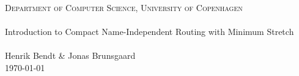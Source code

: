 \begin{titlingpage}
\begin{center}

\normalfont \normalsize
\textsc{Department of Computer Science, University of Copenhagen} \\ [25pt]
\horrule{0.5pt} \\ [0.4cm]
\huge Introduction to Compact Name-Independent Routing with Minimum Stretch\\
\horrule{2pt} \\ [0.5cm]
\normalfont \normalsize
Henrik Bendt \& Jonas Brunsgaard \\ \normalsize
\today

\end{center}
\end{titlingpage}
